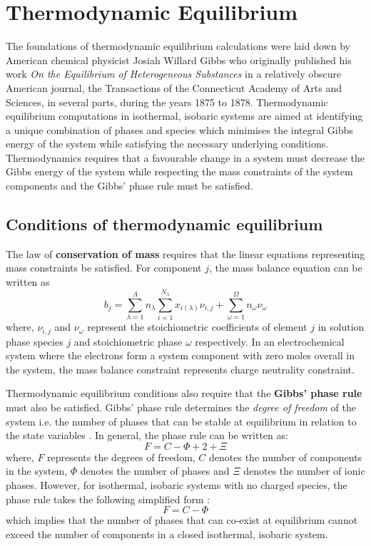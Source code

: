 \section{Thermodynamic Equilibrium}
	The foundations of thermodynamic equilibrium calculations were laid down by American chemical physicist Josiah Willard Gibbs who originally published his work \emph{On the Equilibrium of Heterogeneous Substances} in a relatively obscure American journal, the Transactions of the Connecticut Academy of Arts and Sciences, in several parts, during the years 1875 to 1878. Thermodynamic equilibrium computations in isothermal, isobaric systems are aimed at identifying a unique combination of phases and species which minimises the integral Gibbs energy of the system while satisfying the necessary underlying conditions. Thermodynamics requires that a favourable change in a system must decrease the Gibbs energy of the system while respecting the mass constraints of the system components and the Gibbs' phase rule must be satisfied.
	\subsection{Conditions of thermodynamic equilibrium}\label{sec:eqb_theory}
		The law of \textbf{conservation of mass} requires that the linear equations representing mass constraints be satisfied. For component $j$, the mass balance equation can be written as
			\begin{equation}\label{eq:massbalance}
				b_j = \sum_{\lambda=1}^{\Lambda} n_{\lambda}\sum_{i=1}^{N_{\lambda}}x_{i({\lambda})}{\nu}_{i,j} +  \sum_{\omega=1}^{\Omega} n_{\omega}{\nu}_{\omega}
			\end{equation}
			where, ${\nu}_{i,j}$ and ${\nu}_{\omega}$ represent the stoichiometric coefficients of element $j$ in solution phase species $j$ and stoichiometric phase $\omega$ respectively. In an electrochemical system where the electrons form a system component with zero moles overall in the system, the mass balance constraint represents charge neutrality constraint.

		Thermodynamic equilibrium conditions also require that the \textbf{Gibbs' phase rule} must also be satisfied. Gibbs' phase rule determines the \emph{degree of freedom} of the system i.e. the number of phases that can be stable at equilibrium in relation to the state variables \cite{Gibbs:1878aa}. In general, the phase rule can be written as:
			\begin{equation}
                			F=C-\Phi + 2 + \Xi
            		\end{equation}
            		where, $F$ represents the degrees of freedom, $C$ denotes the number of components in the system, $\Phi$ denotes the number of phases and $\Xi$ denotes the number of ionic phases. However, for isothermal, isobaric systems with no charged species, the phase rule takes the following simplified form :
			\begin{equation}
                			F=C-\Phi
            		\end{equation}
			which implies that the number of phases that can co-exist at equilibrium cannot exceed the number of components in a closed isothermal, isobaric system.

